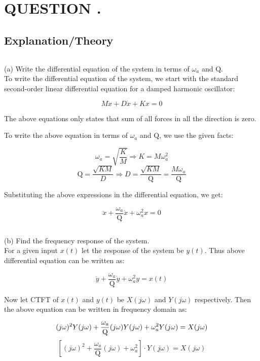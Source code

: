 \section*{QUESTION \quesNo.}

\subsection*{Explanation/Theory}

\[\] \vspace{-40px}

(a) Write the differential equation of the system in terms of $\omega_a$ and $\mathrm{Q}$. \\


To write the differential equation of the system, we start with the standard second-order linear differential equation for a damped harmonic oscillator:

\[
    M\ddot{x} + D\dot{x} + Kx = 0
\]

The above equations only states that sum of all forces in all the direction is zero.

To write the above equation in terms of $\omega_a$ and $\mathrm{Q}$, we use the given facts:

\[
    \omega_a = \sqrt{\frac{K}{M}} \Rightarrow K = M\omega_a^2
\]
\[
    \mathrm{Q} = \frac{\sqrt{KM}}{D} \Rightarrow D = \frac{\sqrt{KM}}{\mathrm{Q}} = \frac{M\omega_a}{\mathrm{Q}}
\]

Substituting the above expressions in the differential equation, we get:

\[
    \ddot{x} + \frac{\omega_a}{\mathrm{Q}}\dot{x} + \omega_a^2x = 0
\]

\[\] \vspace{-40px}

(b) Find the frequency response of the system. \\

For a given input $x(t)$ let the response of the system be $y(t)$. Thus above differential equation can be written as:

\[
    \ddot{y} + \frac{\omega_a}{\mathrm{Q}}\dot{y} + \omega_a^2y = x(t)
\]

Now let CTFT of $x(t)$ and $y(t)$ be $X(j\omega)$ and $Y(j\omega)$ respectively. Then the above equation can be written in frequency domain as:

\[
    (j\omega)^2 Y(j\omega) + \frac{\omega_a}{\mathrm{Q}}(j\omega)Y(j\omega) + \omega_a^2Y(j\omega) = X(j\omega) \\
\]
\[
    \left[ (j\omega)^2 + \frac{\omega_a}{\mathrm{Q}}(j\omega) + \omega_a^2 \right] \cdot Y(j\omega) = X(j\omega)
\]

